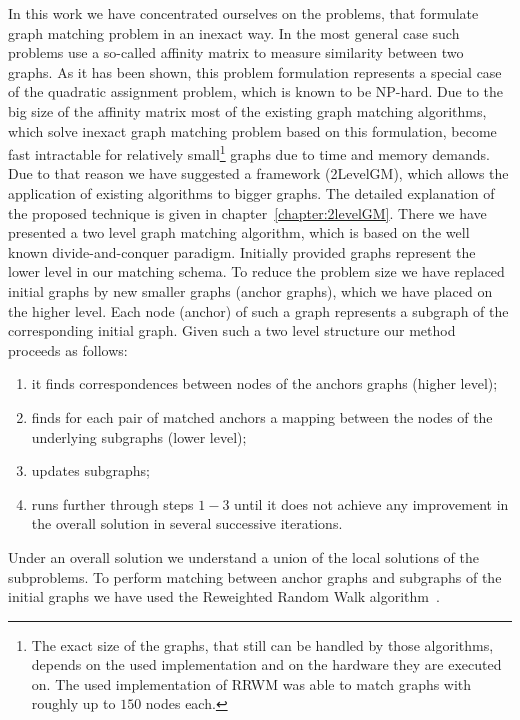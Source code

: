 In this work we have concentrated ourselves on the problems, that formulate graph matching problem in an inexact way. 
In the most general case such problems use a so-called affinity matrix to measure similarity between two graphs. 
As it has been shown, this problem formulation represents a special case of the quadratic assignment problem, which is known to be NP-hard. Due to the big size of the affinity matrix most of the existing graph matching algorithms, which solve inexact graph matching problem based on this formulation, become fast intractable for relatively small\footnote{The exact size of the graphs, that still can be handled by those algorithms, depends on the used implementation and on the hardware they are executed on. The used implementation of RRWM was able to match graphs with roughly up to $150$ nodes each.} graphs due to time and memory demands. Due to that reason we have suggested a framework (2LevelGM), which allows the application of existing algorithms to bigger graphs. The detailed explanation of the proposed technique is given in chapter~\ref{chapter:2levelGM}. There we have presented a two level graph matching algorithm, which is based on the well known divide-and-conquer paradigm. Initially provided graphs represent the lower level in our matching schema. To reduce the problem size we have replaced initial graphs by new smaller graphs (anchor graphs), which we have placed on the higher level. Each node (anchor) of such a graph represents a subgraph of the corresponding initial graph. Given such a two level structure our method proceeds as follows:
\begin{enumerate}
\item it finds correspondences between nodes of the anchors graphs (higher level);
\item finds for each pair of matched anchors a mapping between the nodes of the underlying subgraphs (lower level);
\item updates subgraphs;
\item runs further through steps $1-3$ until it does not achieve any improvement in the overall solution in several successive iterations.
\end{enumerate}
Under an overall solution we understand a union of the local solutions of the subproblems. To perform matching between anchor graphs and subgraphs of the initial graphs we have used the Reweighted Random Walk algorithm~\cite{Cho2010_RRWM}.

